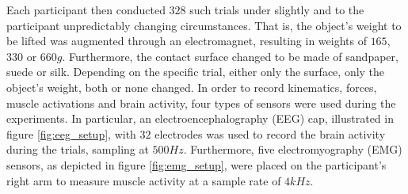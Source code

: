 \documentclass{article} %
\begin{document}
Each participant then conducted $328$ such trials under slightly and to the participant unpredictably changing circumstances. That is, the object's weight to be lifted was augmented through an electromagnet, resulting in weights of $165$, $330$ or $660 g$. Furthermore, the contact surface changed to be made of sandpaper, suede or silk. Depending on the specific trial, either only the surface, only the object's weight, both or none changed. In order to record kinematics, forces, muscle activations and brain activity, four types of sensors were used during the experiments. In particular, an electroencephalography (EEG) cap, illustrated in figure \ref{fig:eeg_setup}, with $32$ electrodes was used to record the brain activity during the trials, sampling at $500 Hz$. Furthermore, five electromyography (EMG) sensors, as depicted in figure \ref{fig:emg_setup}, were placed on the participant's right arm to measure muscle activity at a sample rate of $4 kHz$.
\end{document}
